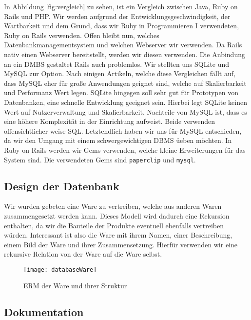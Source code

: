 \documentclass[pdftex,10pt,a4paper]{article}
\begin{document}
In Abbildung \ref{fig:vergleich} zu sehen, ist ein Vergleich zwischen Java, Ruby on Rails und PHP. Wir werden aufgrund der Entwicklungsgeschwindigkeit, der Wartbarkeit und dem Grund, dass wir Ruby in Programmieren I verwendeten, Ruby on Rails verwenden. Offen bleibt nun, welches Datenbankmanagementsystem und welchen Webserver wir verwenden. Da Rails nativ einen Webserver bereitstellt, werden wir diesen verwenden. Die Anbindung an ein DMBS gestaltet Rails auch problemlos. Wir stellten uns SQLite und MySQL zur Option. Nach einigen Artikeln, welche diese Vergleichen f\"allt auf, dass MySQL eher f\"ur gro{\ss}e Anwendungen geignet sind, welche auf Skalierbarkeit und Performanz Wert legen. SQLite hingegen soll sehr gut f\"ur Prototypen von Datenbanken, eine schnelle Entwicklung geeignet sein. Hierbei legt SQLite keinen Wert auf Nutzerverwaltung und Skalierbarkeit. Nachteile von MySQL ist, dass es eine h\"ohere Komplexit\"at in der Einrichtung aufweist. Beide verwenden offensichtlicher weise SQL. Letztendlich haben wir uns f\"ur MySQL entschieden, da wir den Umgang mit einem schwergewichtigen DBMS \"ueben m\"ochten. In Ruby on Rails werden wir Gems verwenden, welche kleine Erweiterungen f\"ur das System sind. Die verwendeten Gems sind \texttt{paperclip} und \texttt{mysql}.

\subsection{Design der Datenbank}
\label{sec:dbdesign}
Wir wurden gebeten eine Ware zu vertreiben, welche aus anderen Waren zusammengesetzt werden kann. Dieses Modell wird dadurch eine Rekursion enthalten, da wir die Bauteile der Produkte eventuell ebenfalls vertreiben w\"urden. Interessant ist also die Ware mit ihrem Namen, einer Beschreibung, einem Bild der Ware und ihrer Zusammensetzung. Hierf\"ur verwenden wir eine rekursive Relation von der Ware auf die Ware selbst.  

\begin{wrapfigure}{R}{0.5\textwidth}
  	\begin{center}
    	\texttt{[image: databaseWare]}
 	 \end{center}
   \caption{ERM der Ware und ihrer Struktur}
\end{wrapfigure}

\subsection{Dokumentation}
\end{document}
